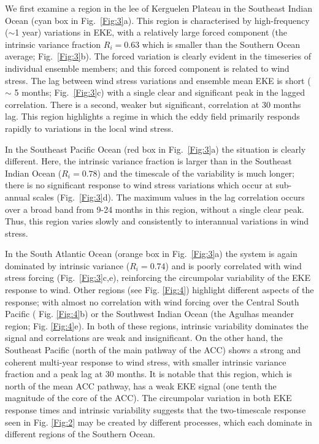 \documentclass{agujournal2019}
\begin{document}
We first examine a region in the lee of Kerguelen Plateau in the Southeast Indian Ocean (cyan box in Fig.~\ref{Fig:3}a).
This region is characterised by high-frequency ($\sim$1 year) variations in EKE, with a relatively large forced component (the intrinsic variance fraction $R_i = 0.63$ which is smaller than the Southern Ocean average; Fig.~\ref{Fig:3}b).
The forced variation is clearly evident in the timeseries of  individual ensemble members; and this forced component is related to wind stress.
The lag between wind stress variations and ensemble mean EKE is short ($\sim$ 5 months; Fig.~\ref{Fig:3}c) with a single clear  and significant peak in the lagged correlation.
There is a second, weaker but significant, correlation at 30 months lag.
This region highlights a regime in which the eddy field primarily responds rapidly to variations in the local wind stress.

In the Southeast Pacific Ocean (red box in Fig.~\ref{Fig:3}a) the situation is clearly different.
Here, the intrinsic variance fraction is larger than in the Southeast Indian Ocean ($R_i=0.78$) and the timescale of the variability is much longer; there is no significant response to wind stress variations which occur at sub-annual scales (Fig.~\ref{Fig:3}d).
The maximum values in the lag correlation occurs over a broad band from 9-24 months in this region, without a single clear peak.
Thus, this region varies slowly and consistently to interannual variations in wind stress.

In the South Atlantic Ocean (orange box in Fig.~\ref{Fig:3}a) the system is again dominated by intrinsic variance ($R_i=0.74$) and is poorly correlated with wind stress forcing (Fig.~\ref{Fig:3}c,e), reinforcing the circumpolar variability of the EKE response to wind.
Other regions (see Fig. \ref{Fig:4}) highlight different aspects of the response;  with almost no correlation with wind forcing over the Central South Pacific ( Fig. \ref{Fig:4}b) or the Southwest Indian Ocean  (the Agulhas meander region; Fig. \ref{Fig:4}e).
In both of these regions, intrinsic variability dominates the signal and correlations are weak and insignificant. 
On the other hand, the Southeast Pacific (north of the main pathway of the ACC) shows a strong and coherent multi-year response to wind stress, with smaller intrinsic variance fraction and a peak lag at 30 months.
It is notable that this region, which is north of the mean ACC pathway, has a weak EKE signal (one tenth the magnitude of the core of the ACC).
The circumpolar variation in both EKE response times and intrinsic variability suggests that the two-timescale response seen in Fig. \ref{Fig:2} may be created by different processes, which each dominate in different regions of the Southern Ocean.
\end{document}
